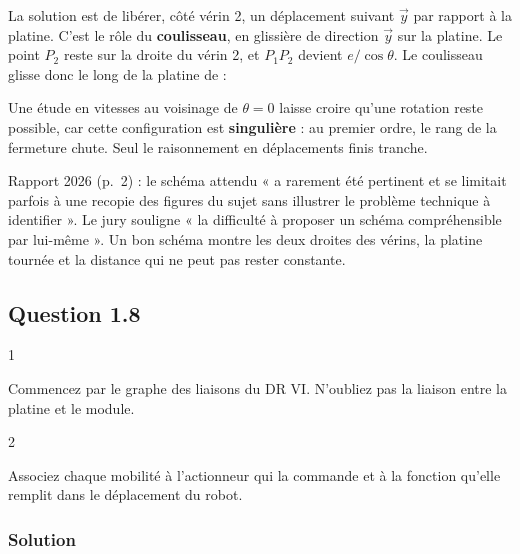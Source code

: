 \documentclass[11pt,a4paper]{article}
\newcommand{\equationajustee}[1]{%
  \sbox{\boiteequation}{$\displaystyle #1$}%
  \ifdim\wd\boiteequation>\linewidth
    \[\resizebox{\linewidth}{!}{\usebox{\boiteequation}}\]%
  \else
    \[#1\]%
  \fi}
\begin{document}
La solution est de libérer, côté vérin 2, un déplacement suivant \(\vec y\) par rapport à la platine. C'est le rôle du \textbf{coulisseau}, en glissière de direction \(\vec y\) sur la platine. Le point \(P_2\) reste sur la droite du vérin 2, et \(P_1P_2\) devient \(e/\cos\theta\). Le coulisseau glisse donc le long de la platine de :

\equationajustee{\frac{e}{\cos\theta} - e \approx \frac{e\,\theta^2}{2}}

\begin{piege}

Une étude en vitesses au voisinage de \(\theta = 0\) laisse croire qu'une rotation reste possible, car cette configuration est \textbf{singulière} : au premier ordre, le rang de la fermeture chute. Seul le raisonnement en déplacements finis tranche.

\end{piege}

\begin{jury}

Rapport 2026 (p.~2) : le schéma attendu « a rarement été pertinent et se limitait parfois à une recopie des figures du sujet sans illustrer le problème technique à identifier ». Le jury souligne « la difficulté à proposer un schéma compréhensible par lui-même ». Un bon schéma montre les deux droites des vérins, la platine tournée et la distance qui ne peut pas rester constante.

\end{jury}

\hypertarget{question-1.8}{%
\subsection{Question 1.8}\label{question-1.8}}

\begin{indication}{1}

Commencez par le graphe des liaisons du DR VI. N'oubliez pas la liaison entre la platine et le module.

\end{indication}

\begin{indication}{2}

Associez chaque mobilité à l'actionneur qui la commande et à la fonction qu'elle remplit dans le déplacement du robot.

\end{indication}

\hypertarget{solution-7}{%
\subsubsection{Solution}\label{solution-7}}
\end{document}
